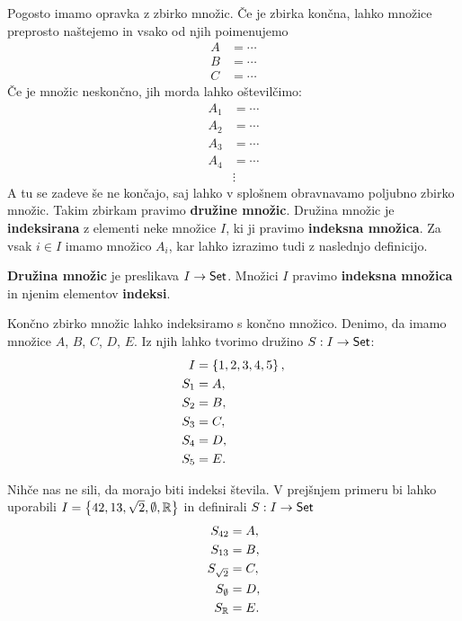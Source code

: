 Pogosto imamo opravka z zbirko množic. Če je zbirka končna, lahko množice preprosto
naštejemo in vsako od njih poimenujemo
%
\begin{align*}
    A &= \cdots \\
    B &= \cdots \\
    C &= \cdots
\end{align*}
%
Če je množic neskončno, jih morda lahko oštevilčimo:
%
\begin{align*}
    A_1 &= \cdots \\
    A_2 &= \cdots \\
    A_3 &= \cdots \\
    A_4 &= \cdots \\
        &\vdots
\end{align*}
%
A tu se zadeve še ne končajo, saj lahko v splošnem obravnavamo poljubno zbirko množic.
Takim zbirkam pravimo \textbf{družine množic}. Družina množic je \textbf{indeksirana} z elementi neke množice $I$, ki ji pravimo \textbf{indeksna množica}. Za vsak $i \in I$ imamo množico $A_i$,  kar lahko izrazimo tudi z naslednjo definicijo.

\begin{definicija}
  \textbf{Družina množic} je preslikava $I \to \mathsf{Set}$. Množici $I$ pravimo \textbf{indeksna množica} in njenim elementov \textbf{indeksi}.
\end{definicija}


\begin{zgled}
  Končno zbirko množic lahko indeksiramo s končno množico. Denimo, da imamo
  množice $A$, $B$, $C$, $D$, $E$. Iz njih lahko tvorimo družino $S : I \to \mathsf{Set}$:
  \begin{align*}
  I &= \left\{1, 2, 3, 4, 5\right\}, \\
  S_1 &= A,\\
  S_2 &= B,\\
  S_3 &= C,\\
  S_4 &= D,\\
  S_5 &= E.
  \end{align*}
\end{zgled}

\begin{zgled}
  Nihče nas ne sili, da morajo biti indeksi števila. V prejšnjem primeru bi lahko
  uporabili $I = \left\{42, 13, \sqrt{2}, \emptyset, \mathbb{R}\right\}$ in definirali $S : I \to \mathsf{Set}$
  \begin{align*}
  S_{42} &= A,\\
  S_{13} &= B,\\
  S_{\sqrt{2}} &= C,\\
  S_{\emptyset} &= D,\\
  S_{\mathbb{R}} &= E.
  \end{align*}
\end{zgled}


